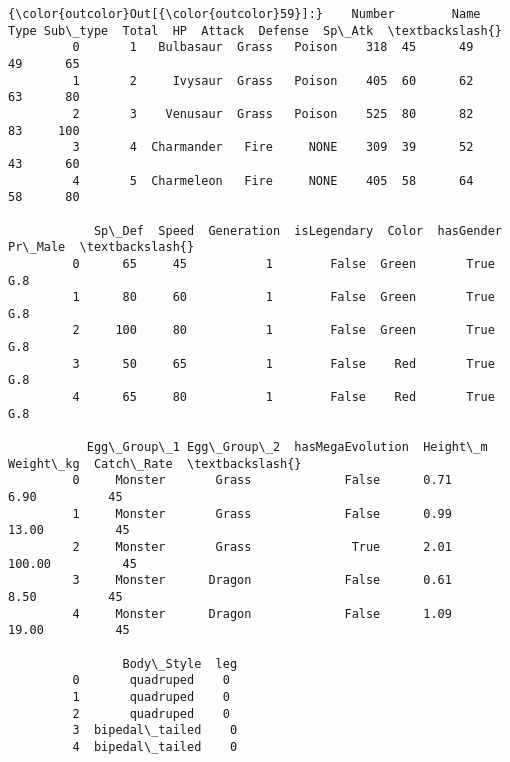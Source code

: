 \documentclass[11pt]{article}
\begin{document}
\begin{Verbatim}[commandchars=\\\{\}]
{\color{outcolor}Out[{\color{outcolor}59}]:}    Number        Name   Type Sub\_type  Total  HP  Attack  Defense  Sp\_Atk  \textbackslash{}
         0       1   Bulbasaur  Grass   Poison    318  45      49       49      65   
         1       2     Ivysaur  Grass   Poison    405  60      62       63      80   
         2       3    Venusaur  Grass   Poison    525  80      82       83     100   
         3       4  Charmander   Fire     NONE    309  39      52       43      60   
         4       5  Charmeleon   Fire     NONE    405  58      64       58      80   
         
            Sp\_Def  Speed  Generation  isLegendary  Color  hasGender Pr\_Male  \textbackslash{}
         0      65     45           1        False  Green       True     G.8   
         1      80     60           1        False  Green       True     G.8   
         2     100     80           1        False  Green       True     G.8   
         3      50     65           1        False    Red       True     G.8   
         4      65     80           1        False    Red       True     G.8   
         
           Egg\_Group\_1 Egg\_Group\_2  hasMegaEvolution  Height\_m  Weight\_kg  Catch\_Rate  \textbackslash{}
         0     Monster       Grass             False      0.71       6.90          45   
         1     Monster       Grass             False      0.99      13.00          45   
         2     Monster       Grass              True      2.01     100.00          45   
         3     Monster      Dragon             False      0.61       8.50          45   
         4     Monster      Dragon             False      1.09      19.00          45   
         
                Body\_Style  leg  
         0       quadruped    0  
         1       quadruped    0  
         2       quadruped    0  
         3  bipedal\_tailed    0  
         4  bipedal\_tailed    0  
\end{Verbatim}
            
\end{document}
